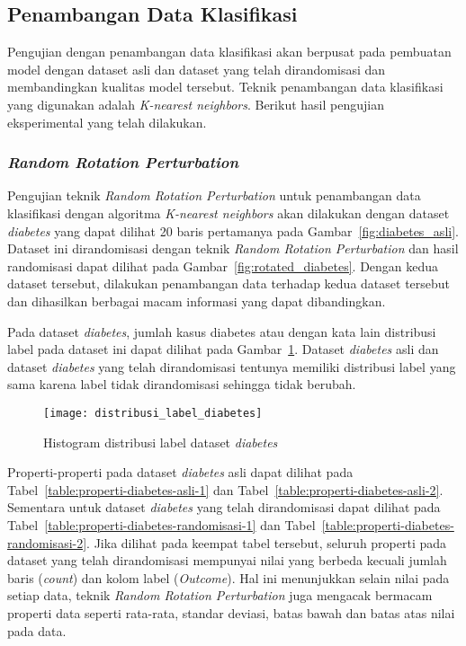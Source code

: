 \subsection{Penambangan Data Klasifikasi}
\label{sec:pengujian-klasifikasi}
Pengujian dengan penambangan data klasifikasi akan berpusat pada pembuatan model dengan dataset asli dan dataset yang telah dirandomisasi dan membandingkan kualitas model tersebut. Teknik penambangan data klasifikasi yang digunakan adalah \textit{K-nearest neighbors}. Berikut hasil pengujian eksperimental yang telah dilakukan.

\subsubsection{\textit{Random Rotation Perturbation}}
\label{sec:pengujian-klasifikasi-rrp}

Pengujian teknik \textit{Random Rotation Perturbation} untuk penambangan data klasifikasi dengan algoritma \textit{K-nearest neighbors} akan dilakukan dengan dataset \textit{diabetes} yang dapat dilihat 20 baris pertamanya pada Gambar~\ref{fig:diabetes_asli}. Dataset ini dirandomisasi dengan teknik \textit{Random Rotation Perturbation} dan hasil randomisasi dapat dilihat pada Gambar~\ref{fig:rotated_diabetes}. Dengan kedua dataset tersebut, dilakukan penambangan data terhadap kedua dataset tersebut dan dihasilkan berbagai macam informasi yang dapat dibandingkan.

Pada dataset \textit{diabetes}, jumlah kasus diabetes atau dengan kata lain distribusi label pada dataset ini dapat dilihat pada Gambar~\ref{fig:distribusi_label_diabetes}. Dataset \textit{diabetes} asli dan dataset \textit{diabetes} yang telah dirandomisasi tentunya memiliki distribusi label yang sama karena label tidak dirandomisasi sehingga tidak berubah.

\begin{figure}
	\centering
	\texttt{[image: distribusi\_label\_diabetes]}
	\caption{Histogram distribusi label dataset \textit{diabetes}}
	\label{fig:distribusi_label_diabetes}
\end{figure}

Properti-properti pada dataset \textit{diabetes} asli dapat dilihat pada Tabel~\ref{table:properti-diabetes-asli-1} dan Tabel~\ref{table:properti-diabetes-asli-2}. Sementara untuk dataset \textit{diabetes} yang telah dirandomisasi dapat dilihat pada Tabel~\ref{table:properti-diabetes-randomisasi-1} dan Tabel~\ref{table:properti-diabetes-randomisasi-2}. Jika dilihat pada keempat tabel tersebut, seluruh properti pada dataset yang telah dirandomisasi mempunyai nilai yang berbeda kecuali jumlah baris (\textit{count}) dan kolom label (\textit{Outcome}). Hal ini menunjukkan selain nilai pada setiap data, teknik \textit{Random Rotation Perturbation} juga mengacak bermacam properti data seperti rata-rata, standar deviasi, batas bawah dan batas atas nilai pada data.

